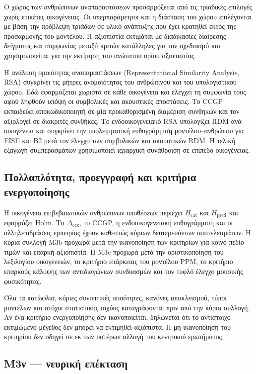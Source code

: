 \documentclass[11pt,a4paper]{article}
\begin{document}
Ο χώρος των ανθρώπινων αναπαραστάσεων προσαρμόζεται από τις τριαδικές επιλογές χωρίς ετικέτες οικογένειας. Οι υπερπαράμετροι και η διάσταση του χώρου επιλέγονται με βάση την πρόβλεψη τριάδων σε υλικό ανάπτυξης που έχει κρατηθεί εκτός της προσαρμογής του μοντέλου. Η αξιοπιστία εκτιμάται με διαδικασίες διαίρεσης δείγματος και συμφωνίας μεταξύ κριτών κατάλληλες για τον σχεδιασμό και χρησιμοποιείται για την εκτίμηση του ανώτατου ορίου αξιοπιστίας.

Η ανάλυση ομοιότητας αναπαραστάσεων (Representational Similarity Analysis, RSA) συγκρίνει τις μήτρες ανομοιότητας του ανθρώπινου και του υπολογιστικού χώρου. Εδώ εφαρμόζεται χωριστά σε κάθε οικογένεια και ελέγχει τη συμφωνία τους αφού ληφθούν υπόψη οι συμβολικές και ακουστικές αποστάσεις. Το CCGP εκπαιδεύει αποκωδικοποιητή σε μία προκαθορισμένη διαμέριση συνθηκών και τον αξιολογεί σε διακριτές συνθήκες. Το ενδοοικογενειακό RSA υπολογίζει RDM ανά οικογένεια και συγκρίνει την υπολειμματική ευθυγράμμιση μοντέλου--ανθρώπου για EISE και B2 μετά τον έλεγχο των συμβολικών και ακουστικών RDM. Η τελική εξαγωγή συμπερασμάτων χρησιμοποιεί ιεραρχική συνάθροιση σε επίπεδο οικογένειας.

\subsection{Πολλαπλότητα, προεγγραφή και κριτήρια ενεργοποίησης}\label{app:human-gates}

Η οικογένεια επιβεβαιωτικών ανθρώπινων υποθέσεων περιέχει $H_{\mathrm{cat}}$ και $H_{\mathrm{pred}}$ και εφαρμόζει Holm. Το $\Delta_{\mathrm{ctx}}$, το CCGP, η ενδοοικογενειακή ευθυγράμμιση και οι αλληλεπιδράσεις εμπειρίας έχουν καθεστώς κύριων δευτερευόντων αποτελεσμάτων. Η κύρια συλλογή M3b προχωρά μετά την ικανοποίηση των κριτηρίων για κοινό πεδίο τιμών και επαρκή αξιοπιστία. Η M3c προχωρά μετά την οριστικοποίηση του λεξιλογίου οικογενειών, το κριτήριο επάρκειας του μοντέλου PPM, το κριτήριο επαρκούς κάλυψης των αντιδιαγώνιων συνδυασμών και τον τυφλό έλεγχο μουσικής φυσικότητας.

Όλα τα κατώφλια, κύριες συνοπτικές ποσότητες, κανόνες αποκλεισμού, τύποι μοντέλων και στόχοι στατιστικής ισχύος καταγράφονται πριν από την κύρια συλλογή. Αν ένα κριτήριο ενεργοποίησης δεν ικανοποιείται, δηλώνεται ότι το αντίστοιχο εκτιμώμενο μέγεθος δεν μπορεί να εκτιμηθεί αξιόπιστα. Η μη ικανοποίηση του κριτηρίου δεν οδηγεί σε εκ των υστέρων αλλαγή του κεντρικού ερωτήματος.

\subsection{M3ν — νευρική επέκταση}\label{app:human-neural}
\end{document}
